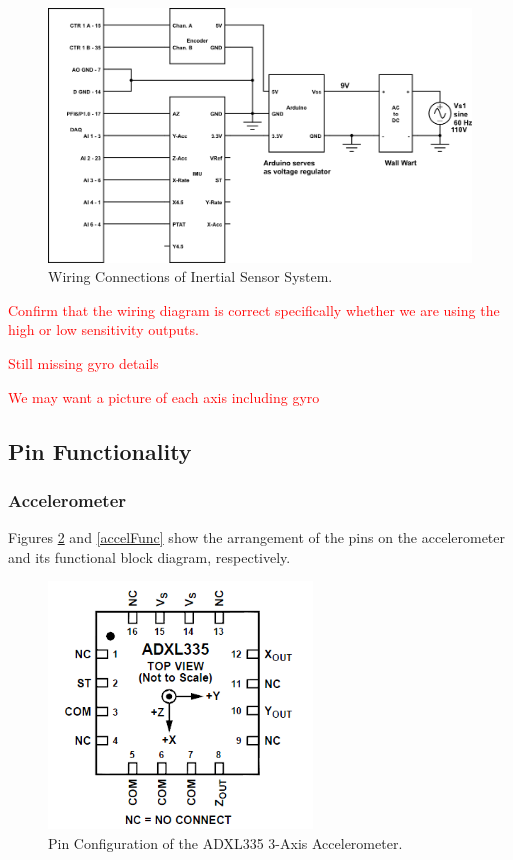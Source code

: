 \documentclass{article}
\newcommand{\xxx}[1]{\textcolor{red}{#1}}
\theoremstyle{plain}
\theoremstyle{definition}
\theoremstyle{remark}
\begin{document}
\begin{figure}[hbt]
\begin{center}
\includegraphics[width = 16cm]{WiringDiagram.png}
\caption{Wiring Connections of Inertial Sensor System.}
\label{wiring}
\end{center}
\end{figure}

\xxx{Confirm that the wiring diagram is correct specifically whether we are using the high or low sensitivity outputs.}

\xxx{Still missing gyro details}

\xxx{We may want a picture of each axis including gyro}

\clearpage

\subsection{Pin Functionality}

\subsubsection{Accelerometer}
Figures \ref{accelPins} and \ref{accelFunc} show the arrangement of the pins on the accelerometer and its functional block diagram, respectively. \\

\begin{figure}[hbt]
\begin{center}
\includegraphics[width = 7cm]{ADXL335Pins.png}
\caption{Pin Configuration of the ADXL335 3-Axis Accelerometer.}
\label{accelPins}
\end{center}
\end{figure}
\end{document}
